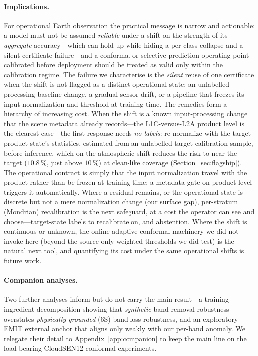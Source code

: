 \documentclass[preprint,3p,times]{elsarticle}
\begin{document}
\paragraph{Implications.} For operational Earth observation the practical message is narrow and actionable: a model must not be assumed \emph{reliable} under a shift on the strength of its \emph{aggregate} accuracy---which can hold up while hiding a per-class collapse and a silent certificate failure---and a conformal or selective-prediction operating point calibrated before deployment should be treated as valid only within the calibration regime. The failure we characterise is the \emph{silent} reuse of one certificate when the shift is not flagged as a distinct operational state: an unlabelled processing-baseline change, a gradual sensor drift, or a pipeline that freezes its input normalization and threshold at training time. The remedies form a hierarchy of increasing cost. When the shift is a known input-processing change that the scene metadata already records---the L1C-versus-L2A product level is the clearest case---the first response needs \emph{no labels}: re-normalize with the target product state's statistics, estimated from an unlabelled target calibration sample, before inference, which on the atmospheric shift reduces the risk to near the target ($10.8\,\%$, just above $10\,\%$) at clean-like coverage (Section~\ref{sec:flagship}). The operational contract is simply that the input normalization travel with the product rather than be frozen at training time; a metadata gate on product level triggers it automatically. Where a residual remains, or the operational state is discrete but not a mere normalization change (our surface gap), per-stratum (Mondrian) recalibration is the next safeguard, at a cost the operator can see and choose---target-state labels to recalibrate on, and abstention. Where the shift is continuous or unknown, the online adaptive-conformal machinery we did not invoke here (beyond the source-only weighted thresholds we did test) is the natural next tool, and quantifying its cost under the same operational shifts is future work.

\paragraph{Companion analyses.} Two further analyses inform but do not carry the main result---a training-ingredient decomposition showing that \emph{synthetic} band-removal robustness overstates \emph{physically-grounded} (6S) band-loss robustness, and an exploratory EMIT external anchor that aligns only weakly with our per-band anomaly. We relegate their detail to Appendix~\ref{app:companion} to keep the main line on the load-bearing CloudSEN12 conformal experiments.
\end{document}
